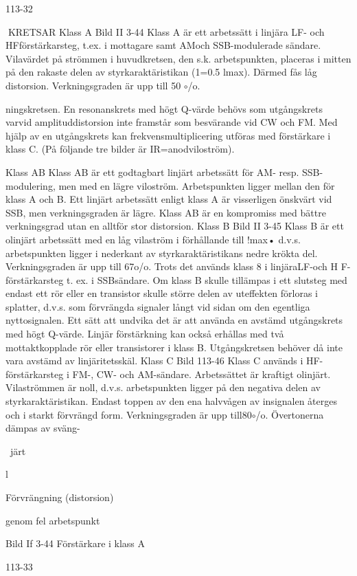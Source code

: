 \documentclass[a4paper,twoside,twocolumn,openright]{book}
\begin{document}
{{{{{{{113-32

KRETSAR
Klass A
Bild II 3-44
Klass A är ett arbetssätt i linjära LF- och HFförstärkarsteg, t.ex. i mottagare samt AMoch SSB-modulerade sändare. Vilavärdet
på strömmen i huvudkretsen, den s.k. arbetspunkten, placeras i mitten på den rakaste delen av styrkaraktäristikan (1=0.5 lmax).
Därmed fås låg distorsion. Verkningsgraden
är upp till 50 $\circ$/o.

ningskretsen. En resonanskrets med högt
Q-värde behövs som utgångskrets varvid
amplituddistorsion inte framstår som besvärande vid CW och FM. Med hjälp av en
utgångskrets kan frekvensmultiplicering utföras med förstärkare i klass C.
(På följande tre bilder är IR=anodviloström).

Klass AB
Klass AB är ett godtagbart linjärt arbetssätt
för AM- resp. SSB-modulering, men med en
lägre viloström. Arbetspunkten ligger mellan
den för klass A och B. Ett linjärt arbetssätt
enligt klass A är visserligen önskvärt vid
SSB, men verkningsgraden är lägre. Klass
AB är en kompromiss med bättre verkningsgrad utan en alltför stor distorsion.
Klass B
Bild II 3-45
Klass B är ett olinjärt arbetssätt med en låg
vilaström i förhållande till !max• d.v.s. arbetspunkten ligger i nederkant av styrkaraktäristikans nedre krökta del. Verkningsgraden
är upp till 67o/o. Trots det används klass 8 i
linjäraLF-och H F-förstärkarsteg t. ex. i SSBsändare.
Om klass B skulle tillämpas i ett slutsteg
med endast ett rör eller en transistor skulle
större delen av uteffekten förloras i splatter,
d.v.s. som förvrängda signaler långt vid sidan om den egentliga nyttosignalen. Ett sätt
att undvika det är att använda en avstämd
utgångskrets med högt Q-värde. Linjär förstärkning kan också erhållas med två mottaktkopplade rör eller transistorer i klass B.
Utgångskretsen behöver då inte vara avstämd av linjäritetsskäl.
Klass C
Bild 113-46
Klass C används i HF-förstärkarsteg i FM-,
CW- och AM-sändare. Arbetssättet är kraftigt olinjärt. Vilaströmmen är noll, d.v.s. arbetspunkten ligger på den negativa delen av
styrkaraktäristikan. Endast toppen av den
ena halvvågen av insignalen återges och i
starkt förvrängd form. Verkningsgraden är
upp till80$\circ$/o. Övertonerna dämpas av sväng-

~järt

l

Förvrängning
(distorsion)

genom fel arbetspunkt

Bild If 3-44 Förstärkare i klass A

113-33

}}}}}}}
\end{document}
